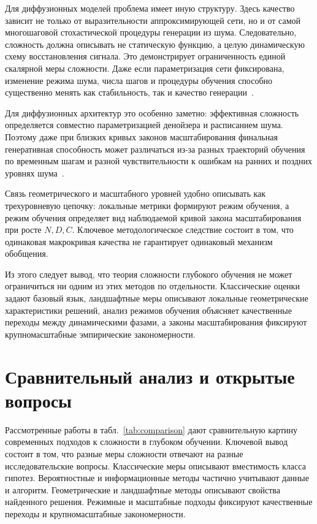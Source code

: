 Для диффузионных моделей проблема имеет иную структуру.
Здесь качество зависит не только от выразительности аппроксимирующей сети, но и от самой многошаговой стохастической процедуры генерации из шума.
Следовательно, сложность должна описывать не статическую функцию, а целую динамическую схему восстановления сигнала.
Это демонстрирует ограниченность единой скалярной меры сложности.
Даже если параметризация сети фиксирована, изменение режима шума, числа шагов и процедуры обучения способно существенно менять как стабильность, так и качество генерации~\cite{ho2020denoising}.

Для диффузионных архитектур это особенно заметно: эффективная сложность определяется совместно параметризацией денойзера и расписанием шума. Поэтому даже при близких кривых законов масштабирования финальная генеративная способность может различаться из-за разных траекторий обучения по временным шагам и разной чувствительности к ошибкам на ранних и поздних уровнях шума~\cite{diffusionTransformerScaling2024}.

Связь геометрического и масштабного уровней удобно описывать как трехуровневую цепочку: локальные метрики формируют режим обучения, а режим обучения определяет вид наблюдаемой кривой закона масштабирования при росте $N,D,C$. Ключевое методологическое следствие состоит в том, что одинаковая макрокривая качества не гарантирует одинаковый механизм обобщения.

Из этого следует вывод, что теория сложности глубокого обучения не может ограничиться ни одним из этих методов по отдельности.
Классические оценки задают базовый язык, ландшафтные меры описывают локальные геометрические характеристики решений, анализ режимов обучения объясняет качественные переходы между динамическими фазами, а законы масштабирования фиксируют крупномасштабные эмпирические закономерности.

\section{Сравнительный анализ и открытые вопросы}

Рассмотренные работы в табл.~\ref{tab:comparison} дают сравнительную картину современных подходов к сложности в глубоком обучении.
Ключевой вывод состоит в том, что разные меры сложности отвечают на разные исследовательские вопросы.
Классические меры описывают вместимость класса гипотез.
Вероятностные и информационные методы частично учитывают данные и алгоритм.
Геометрические и ландшафтные методы описывают свойства найденного решения.
Режимные и масштабные подходы фиксируют качественные переходы и крупномасштабные закономерности.

